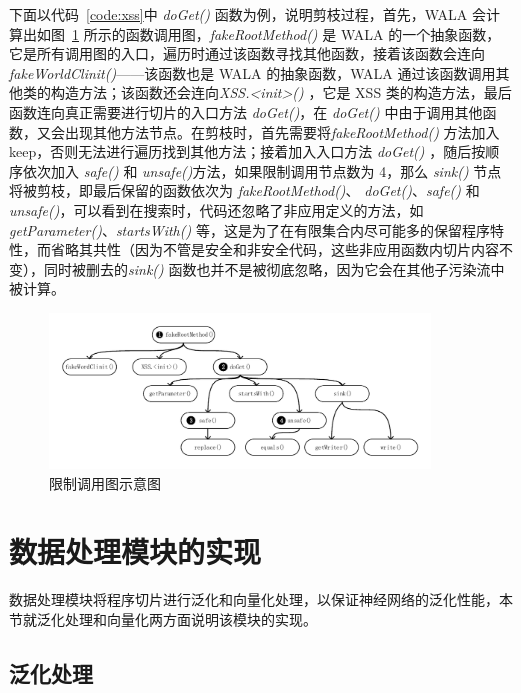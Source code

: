 下面以代码~\ref{code:xss}中 \textit{doGet()} 函数为例，说明剪枝过程，首先，WALA 会计算出如图~\ref{prune} 所示的函数调用图，\textit{fakeRootMethod()} 是 WALA 的一个抽象函数，它是所有调用图的入口，遍历时通过该函数寻找其他函数，接着该函数会连向 \textit{fakeWorldClinit()}——该函数也是 WALA 的抽象函数，WALA 通过该函数调用其他类的构造方法；该函数还会连向\textit{XSS.<init>()} ，它是 XSS 类的构造方法，最后函数连向真正需要进行切片的入口方法 \textit{doGet()}，在 \textit{doGet()} 中由于调用其他函数，又会出现其他方法节点。在剪枝时，首先需要将\textit{fakeRootMethod()} 方法加入 keep，否则无法进行遍历找到其他方法；接着加入入口方法 \textit{doGet()} ，随后按顺序依次加入 \textit{safe()} 和 \textit{unsafe()}方法，如果限制调用节点数为 4，那么 \textit{sink()} 节点将被剪枝，即最后保留的函数依次为 \textit{fakeRootMethod()}、 \textit{doGet()}、\textit{safe()} 和 \textit{unsafe()}，可以看到在搜索时，代码还忽略了非应用定义的方法，如\textit{getParameter()}、\textit{startsWith()} 等，这是为了在有限集合内尽可能多的保留程序特性，而省略其共性（因为不管是安全和非安全代码，这些非应用函数内切片内容不变），同时被删去的\textit{sink()} 函数也并不是被彻底忽略，因为它会在其他子污染流中被计算。
    
\begin{figure}[!htb]
    \centering
    \includegraphics[width=0.9\textwidth]{FIGs/chapter4/prune.pdf}
    \caption{限制调用图示意图}\label{prune}
\end{figure}


\section{数据处理模块的实现}

数据处理模块将程序切片进行泛化和向量化处理，以保证神经网络的泛化性能，本节就泛化处理和向量化两方面说明该模块的实现。\\

\subsection{泛化处理}

